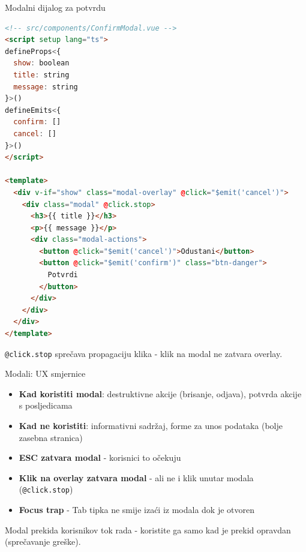 \begin{frame}[fragile,shrink=5]{Modalni dijalog za potvrdu}
\begin{lstlisting}[language=html]
<!-- src/components/ConfirmModal.vue -->
<script setup lang="ts">
defineProps<{
  show: boolean
  title: string
  message: string
}>()
defineEmits<{
  confirm: []
  cancel: []
}>()
</script>

<template>
  <div v-if="show" class="modal-overlay" @click="$emit('cancel')">
    <div class="modal" @click.stop>
      <h3>{{ title }}</h3>
      <p>{{ message }}</p>
      <div class="modal-actions">
        <button @click="$emit('cancel')">Odustani</button>
        <button @click="$emit('confirm')" class="btn-danger">
          Potvrdi
        </button>
      </div>
    </div>
  </div>
</template>
\end{lstlisting}

\vspace{0.4em}
\texttt{@click.stop} sprečava propagaciju klika - klik na modal ne zatvara overlay.
\end{frame}

\begin{frame}{Modali: UX smjernice}
\begin{itemize}
  \item \textbf{Kad koristiti modal}: destruktivne akcije (brisanje, odjava), potvrda akcije s posljedicama
  \item \textbf{Kad ne koristiti}: informativni sadržaj, forme za unos podataka (bolje zasebna stranica)
  \item \textbf{ESC zatvara modal} - korisnici to očekuju
  \item \textbf{Klik na overlay zatvara modal} - ali ne i klik unutar modala (\texttt{@click.stop})
  \item \textbf{Focus trap} - Tab tipka ne smije izaći iz modala dok je otvoren
\end{itemize}

\vspace{0.6em}
Modal prekida korisnikov tok rada - koristite ga samo kad je prekid opravdan (sprečavanje greške).
\end{frame}

